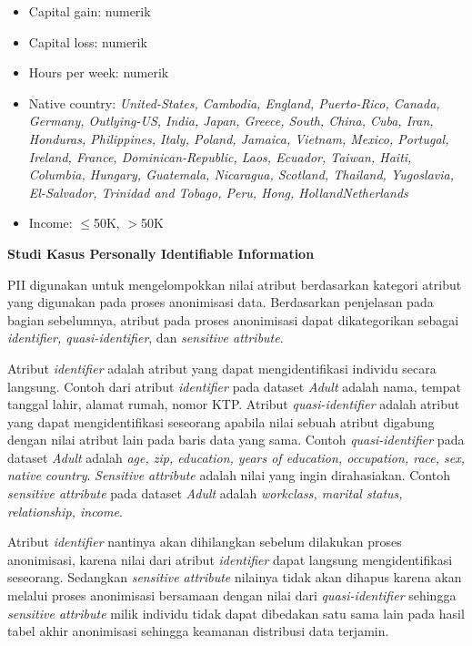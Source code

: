 \documentclass[a4paper,twoside]{article}
\begin{document}
\begin{enumerate}
\begin{itemize}
\item Capital gain: numerik

\item Capital loss: numerik

\item Hours per week: numerik

\item Native country: \textit{United-States, Cambodia, England, Puerto-Rico, Canada, Germany, Outlying-US, India, Japan, Greece, South, China, Cuba, Iran, Honduras, Philippines, Italy, Poland, Jamaica, Vietnam, Mexico, Portugal, Ireland, France, Dominican-Republic, Laos, Ecuador, Taiwan, Haiti, Columbia, Hungary, Guatemala, Nicaragua, Scotland, Thailand, Yugoslavia, El-Salvador, Trinidad and Tobago, Peru, Hong, HollandNetherlands}

\item Income: $\leq$50K, $>$50K
\end{itemize}

\textbf{Studi Kasus Personally Identifiable Information}

PII digunakan untuk mengelompokkan nilai atribut berdasarkan kategori atribut yang digunakan pada proses anonimisasi data. Berdasarkan penjelasan pada bagian sebelumnya, atribut pada proses anonimisasi dapat dikategorikan sebagai \textit{identifier, quasi-identifier}, dan \textit{sensitive attribute}. 

\par Atribut \textit{identifier} adalah atribut yang dapat mengidentifikasi individu secara langsung. Contoh dari atribut \textit{identifier} pada dataset \textit{Adult} adalah nama, tempat tanggal lahir, alamat rumah, nomor KTP. Atribut \textit{quasi-identifier} adalah atribut yang dapat mengidentifikasi seseorang apabila nilai sebuah atribut digabung dengan nilai atribut lain pada baris data yang sama. Contoh \textit{quasi-identifier} pada dataset \textit{Adult} adalah \textit{age, zip, education, years of education, occupation, race, sex, native country}. \textit{Sensitive attribute} adalah nilai yang ingin dirahasiakan. Contoh \textit{sensitive attribute} pada dataset \textit{Adult} adalah \textit{workclass, marital status, relationship, income}.

\par Atribut \textit{identifier} nantinya akan dihilangkan sebelum dilakukan proses anonimisasi, karena nilai dari atribut \textit{identifier} dapat langsung mengidentifikasi seseorang. Sedangkan \textit{sensitive attribute} nilainya tidak akan dihapus karena akan melalui proses anonimisasi bersamaan dengan nilai dari \textit{quasi-identifier} sehingga \textit{sensitive attribute} milik individu tidak dapat dibedakan satu sama lain pada hasil tabel akhir anonimisasi sehingga keamanan  distribusi data terjamin.\\


\end{enumerate}
\end{document}
